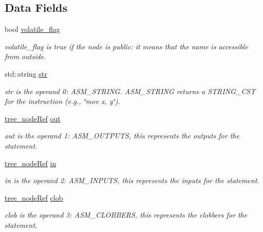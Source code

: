 \subsection*{Data Fields}
\begin{DoxyCompactItemize}
\item 
bool \hyperlink{structgimple__asm_a0ae87790fe89d89a037353543d4ea531}{volatile\+\_\+flag}
\begin{DoxyCompactList}\small\item\em volatile\+\_\+flag is true if the node is public\+: it means that the name is accessible from outside. \end{DoxyCompactList}\item 
std\+::string \hyperlink{structgimple__asm_a701f4a2b5bb448ea6dd172aaa75fad27}{str}
\begin{DoxyCompactList}\small\item\em str is the operand 0\+: A\+S\+M\+\_\+\+S\+T\+R\+I\+NG. A\+S\+M\+\_\+\+S\+T\+R\+I\+NG returns a S\+T\+R\+I\+N\+G\+\_\+\+C\+ST for the instruction (e.\+g., \char`\"{}mov x, y\char`\"{}). \end{DoxyCompactList}\item 
\hyperlink{tree__node_8hpp_a6ee377554d1c4871ad66a337eaa67fd5}{tree\+\_\+node\+Ref} \hyperlink{structgimple__asm_ada466d4ec1f1f8779851948cc7761d0d}{out}
\begin{DoxyCompactList}\small\item\em out is the operand 1\+: A\+S\+M\+\_\+\+O\+U\+T\+P\+U\+TS, this represents the outputs for the statement. \end{DoxyCompactList}\item 
\hyperlink{tree__node_8hpp_a6ee377554d1c4871ad66a337eaa67fd5}{tree\+\_\+node\+Ref} \hyperlink{structgimple__asm_a78a8fb3c379a345757761c890a18bfb8}{in}
\begin{DoxyCompactList}\small\item\em in is the operand 2\+: A\+S\+M\+\_\+\+I\+N\+P\+U\+TS, this represents the inputs for the statement. \end{DoxyCompactList}\item 
\hyperlink{tree__node_8hpp_a6ee377554d1c4871ad66a337eaa67fd5}{tree\+\_\+node\+Ref} \hyperlink{structgimple__asm_af8b683346be8e133805b0398db9de8b7}{clob}
\begin{DoxyCompactList}\small\item\em clob is the operand 3\+: A\+S\+M\+\_\+\+C\+L\+O\+B\+B\+E\+RS, this represents the clobbers for the statement. \end{DoxyCompactList}\end{DoxyCompactItemize}
